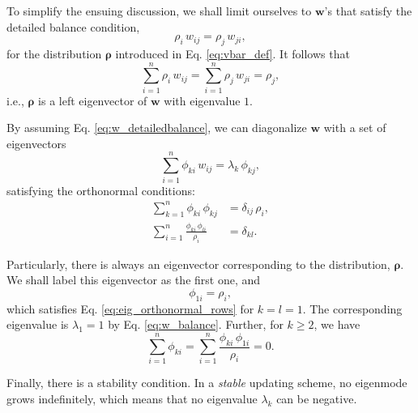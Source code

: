 \documentclass[reprint, floatfix]{revtex4-1}
\begin{document}
To simplify the ensuing discussion,
we shall limit ourselves to $\mathbf w$'s
that satisfy
the detailed balance condition,
%
\begin{equation}
  \rho_i \, w_{ij} = \rho_j \, w_{ji}
  ,
  \label{eq:w_detailedbalance}
\end{equation}
%
for the distribution $\pmb \rho$
introduced in Eq. \eqref{eq:vbar_def}.
%
It follows that
\begin{equation}
  \sum_{i = 1}^n \rho_i \, w_{ij}
  =
  \sum_{i = 1}^n \rho_j \, w_{ji}
  =
  \rho_j,
  \label{eq:w_balance}
\end{equation}
%
i.e., $\mathbf \rho$ is a left eigenvector of
$\mathbf w$ with eigenvalue $1$.



By assuming Eq. \eqref{eq:w_detailedbalance},
we can diagonalize $\mathbf w$ with a set of
eigenvectors
%
\begin{equation}
  \sum_{i = 1}^n \phi_{ki} \, w_{ij}
  =
  \lambda_k \, \phi_{kj}
  ,
\label{eq:eig_w}
\end{equation}
%
satisfying the orthonormal conditions\cite{vankampen}:
%
\begin{align}
  \sum_{k = 1}^n
    \phi_{ki} \, \phi_{kj}
  &=
  \delta_{ij} \, \rho_i,
  \label{eq:eig_orthonormal_cols}
  \\
  \sum_{i = 1}^n
    \frac{ \phi_{ki} \, \phi_{li} }
         { \rho_i }
  &=
  \delta_{kl}
  .
\label{eq:eig_orthonormal_rows}
\end{align}

Particularly, there is always an eigenvector
corresponding to the distribution, $\pmb \rho$.
%
We shall label this eigenvector as the first one,
and
%
\begin{equation}
  \phi_{1i} = \rho_i,
\label{eq:eigenmode1}
\end{equation}
%
which satisfies Eq. \eqref{eq:eig_orthonormal_rows}
for $k = l = 1$.
%
The corresponding eigenvalue is $\lambda_1 = 1$
by Eq. \eqref{eq:w_balance}.
%
Further, for $k \ge 2$, we have
%
\begin{equation}
  \sum_{ i = 1 }^n \phi_{ki}
  =
  \sum_{ i = 1 }^n
    \frac{ \phi_{ki} \, \phi_{1i} }
         { \rho_i }
  =
  0
  .
\label{eq:ortho1}
\end{equation}

Finally, there is a stability condition.
%
In a \emph{stable} updating scheme,
no eigenmode grows indefinitely,
which means that no eigenvalue $\lambda_k$
can be negative.
\end{document}
